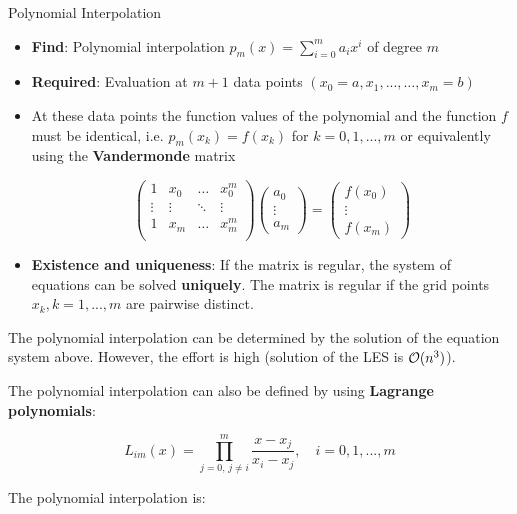 \begin{vbframe}{Polynomial Interpolation}

\begin{itemize}
\item \textbf{Find}: Polynomial interpolation $p_m(x) = \sum_{i = 0}^m a_i x^i$ of degree $m$
\item \textbf{Required}: Evaluation at $m + 1$ data points $(x_{0} = a, x_1, ..., \ldots, x_{m} = b)$
\item At these data points the function values of the polynomial and the function $f$ must be identical, i.e. $p_m(x_k) = f(x_k)$ for $k = 0, 1, ..., m$ or equivalently using the \textbf{Vandermonde} matrix
\begin{footnotesize}
$$
\begin{pmatrix}
1 & x_0 & \hdots & x_0^m \\
\vdots & \vdots & \ddots & \vdots \\
1 & x_m & \hdots & x_m^m \\
\end{pmatrix}
\begin{pmatrix}
a_0 \\ \vdots \\ a_m
\end{pmatrix}
=
\begin{pmatrix}
f(x_0) \\ \vdots \\ f(x_m)
\end{pmatrix}
$$
\end{footnotesize}

\item \textbf{Existence and uniqueness}: If the matrix is regular, the system of equations can be solved \textbf{uniquely}. The matrix is regular if the grid points $x_k, k = 1, ..., m$ are pairwise distinct.
\end{itemize}


\framebreak

The polynomial interpolation can be determined by the solution of the equation system above. However, the effort is high (solution of the LES is $\mathcal{O}(n^3)$).

\lz

The polynomial interpolation can also be defined by using \textbf{Lagrange polynomials}:

$$
L_{im}(x) = \prod_{j = 0,\, j \not= i}^m \frac{x - x_{j}}{x_{i} - x_{j}}, \quad i = 0, 1, ..., m
$$

The polynomial interpolation is:


\end{vbframe}
